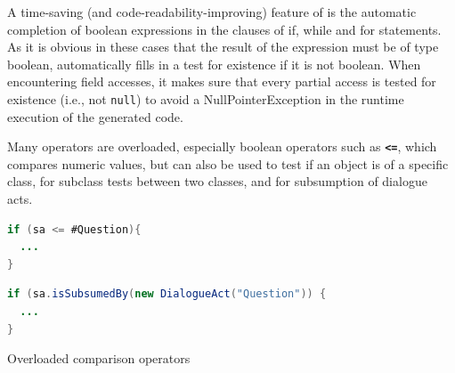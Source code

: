 
A time-saving (and code-readability-improving) feature of \vonda is the automatic completion of boolean expressions in the clauses of if, while and for statements. As it is obvious in these cases that the result of the expression must be of type boolean, \vonda automatically fills in a test for existence if it is not boolean. When encountering field accesses, it makes sure that every partial access is tested for existence (i.e., not \texttt{null}) to avoid a NullPointerException in the runtime execution of the generated code.


Many operators are overloaded, especially boolean operators such as
\textbf{\texttt{<=}}, which compares numeric values, but can also be used to test if an
object is of a specific class, for subclass tests between two classes, and for
subsumption of dialogue acts.

\begin{table}[htbp]
  \centering
  \begin{footnotesize}
    \begin{minipage}{0.3\textwidth}
\begin{lstlisting}[language=Java]
if (sa <= #Question){
  ...
}
\end{lstlisting}
    \end{minipage}
    \begin{minipage}{0.5\textwidth}
\begin{lstlisting}[language=Java]
if (sa.isSubsumedBy(new DialogueAct("Question")) {
  ...
}
\end{lstlisting}
    \end{minipage}
  \end{footnotesize}

  \caption{Overloaded comparison operators}
  \label{tab:overloaded-comparison}
\end{table}

